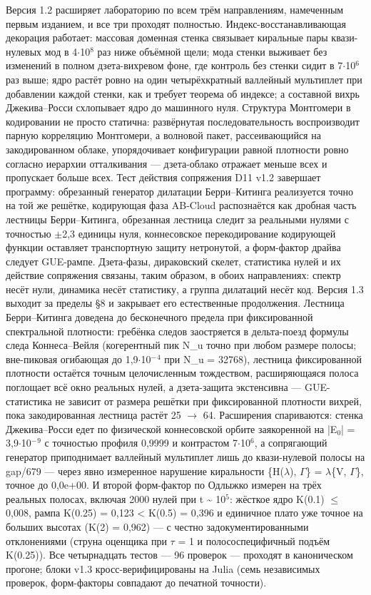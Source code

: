 \documentclass[11pt,a4paper]{article}
\begin{document}
Версия 1.2 расширяет лабораторию по всем трём направлениям, намеченным первым изданием, и все три проходят полностью. Индекс-восстанавливающая декорация работает: массовая доменная стенка связывает киральные пары квази-нулевых мод в 4$\cdot$10$^{8}$ раз ниже объёмной щели; мода стенки выживает без изменений в полном дзета-вихревом фоне, где контроль без стенки сидит в 7$\cdot$10$^{6}$ раз выше; ядро растёт ровно на один четырёхкратный валлейный мультиплет при добавлении каждой стенки, как и требует теорема об индексе; а составной вихрь Джекива--Росси схлопывает ядро до машинного нуля. Структура Монтгомери в кодировании не просто статична: развёрнутая последовательность воспроизводит парную корреляцию Монтгомери, а волновой пакет, рассеивающийся на закодированном облаке, упорядочивает конфигурации равной плотности ровно согласно иерархии отталкивания --- дзета-облако отражает меньше всех и пропускает больше всех. Тест действия сопряжения D11 v1.2 завершает программу: обрезанный генератор дилатации Берри--Китинга реализуется точно на той же решётке, кодирующая фаза AB-Cloud распознаётся как дробная часть лестницы Берри--Китинга, обрезанная лестница следит за реальными нулями с точностью $\pm$2,3 единицы нуля, коннесовское перекодирование кодирующей функции оставляет транспортную защиту нетронутой, а форм-фактор драйва следует GUE-рампе. Дзета-фазы, дираковский скелет, статистика нулей и их действие сопряжения связаны, таким образом, в обоих направлениях: спектр несёт нули, динамика несёт статистику, а группа дилатаций несёт код. Версия 1.3 выходит за пределы \S{}8 и закрывает его естественные продолжения. Лестница Берри--Китинга доведена до бесконечного предела при фиксированной спектральной плотности: гребёнка следов заостряется в дельта-поезд формулы следа Коннеса--Вейля (когерентный пик N\_\allowbreak{}u точно при любом размере полосы; вне-пиковая огибающая до 1,9$\cdot$10$^{-}$$^{4}$ при N\_\allowbreak{}u = 32768), лестница фиксированной плотности остаётся точным целочисленным тождеством, расширяющаяся полоса поглощает всё окно реальных нулей, а дзета-защита экстенсивна --- GUE-статистика не зависит от размера решётки при фиксированной плотности вихрей, пока закодированная лестница растёт 25 $\to$ 64. Расширения спариваются: стенка Джекива--Росси едет по физической коннесовской орбите заякоренной на |E$_{0}$| = 3,9$\cdot$10$^{-}$$^{9}$ с точностью профиля 0,9999 и контрастом 7$\cdot$10$^{6}$, а сопрягающий генератор приподнимает валлейный мультиплет лишь до квази-нулевой полосы на gap/679 --- через явно измеренное нарушение киральности \{H($\lambda$), $\Gamma$\} = $\lambda$\{V, $\Gamma$\}, точное до 0,0e+00. И второй форм-фактор по Одлыжко измерен на трёх реальных полосах, включая 2000 нулей при t \textasciitilde{} 10$^{5}$: жёсткое ядро K(0.1) $\le$ 0,008, рампа K(0.25) = 0,123 < K(0.5) = 0,396 и единичное плато уже точное на больших высотах (K(2) = 0,962) --- с честно задокументированными отклонениями (струна оценщика при $\tau$ = 1 и полососпецифичный подъём K(0.25)). Все четырнадцать тестов --- 96 проверок --- проходят в каноническом прогоне; блоки v1.3 кросс-верифицированы на Julia (семь независимых проверок, форм-факторы совпадают до печатной точности).
\end{document}
